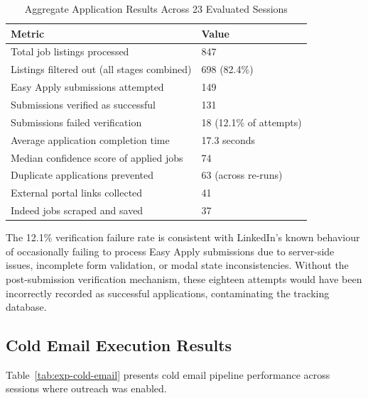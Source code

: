 \documentclass[12pt, a4paper, oneside]{report}
\begin{document}
\begin{table}[H]
\centering
\caption{Aggregate Application Results Across 23 Evaluated Sessions}
\label{tab:exp-applications}
\small
\begin{tabularx}{\textwidth}{|l|X|}
\hline
\textbf{Metric} & \textbf{Value} \\
\hline
Total job listings processed & 847 \\
\hline
Listings filtered out (all stages combined) & 698 (82.4\%) \\
\hline
Easy Apply submissions attempted & 149 \\
\hline
Submissions verified as successful & 131 \\
\hline
Submissions failed verification & 18 (12.1\% of attempts) \\
\hline
Average application completion time & 17.3 seconds \\
\hline
Median confidence score of applied jobs & 74 \\
\hline
Duplicate applications prevented & 63 (across re-runs) \\
\hline
External portal links collected & 41 \\
\hline
Indeed jobs scraped and saved & 37 \\
\hline
\end{tabularx}
\end{table}

The 12.1\% verification failure rate is consistent with LinkedIn's known behaviour of occasionally failing to process Easy Apply submissions due to server-side issues, incomplete form validation, or modal state inconsistencies. Without the post-submission verification mechanism, these eighteen attempts would have been incorrectly recorded as successful applications, contaminating the tracking database.

\subsection{Cold Email Execution Results}

Table~\ref{tab:exp-cold-email} presents cold email pipeline performance across sessions where outreach was enabled.
\end{document}
